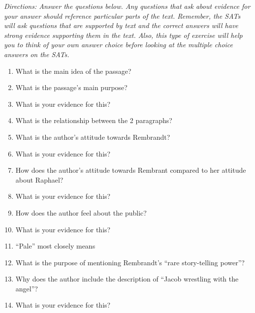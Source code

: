 \bigskip
\textit{Directions: Answer the questions below. Any questions that ask about evidence for your answer should reference particular parts of the text. Remember, the SATs will ask questions that are supported by text and the correct answers will have strong evidence supporting them in the text. Also, this type of exercise will help you to think of your own answer choice before looking at the multiple choice answers on the SATs.}

\begin{enumerate}

\item What is the main idea of the passage? \hrulefill

\item What is the passage's main purpose? \hrulefill

\item What is your evidence for this? \hrulefill

\item What is the relationship between the 2 paragraphs? \hrulefill

\item What is the author's attitude towards Rembrandt? \hrulefill

\item What is your evidence for this? \hrulefill

\item How does the author's attitude towards Rembrant compared to her attitude about Raphael? \hrulefill

\item What is your evidence for this? \hrulefill

\item How does the author feel about the public? \hrulefill

\item What is your evidence for this? \hrulefill

\item ``Pale'' most closely means \hrulefill


\item What is the purpose of mentioning Rembrandt's ``rare story-telling power''? \hrulefill

\item Why does the author include the description of ``Jacob wrestling with the angel''? \hrulefill

\item What is your evidence for this? \hrulefill
\end{enumerate}


